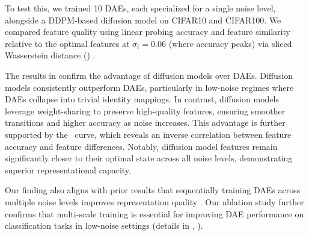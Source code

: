 To test this, we trained 10 DAEs, each specialized for a single noise level, alongside a DDPM-based diffusion model on CIFAR10 and CIFAR100. We compared feature quality using linear probing accuracy and feature similarity relative to the optimal features at $\sigma_t = 0.06$ (where accuracy peaks) via sliced Wasserstein distance (\SWD) \citep{doan2024assessing}.

The results in  confirm the advantage of diffusion models over DAEs. Diffusion models consistently outperform DAEs, particularly in low-noise regimes where DAEs collapse into trivial identity mappings. In contrast, diffusion models leverage weight-sharing to preserve high-quality features, ensuring smoother transitions and higher accuracy as noise increases. This advantage is further supported by the \SWD~curve, which reveals an inverse correlation between feature accuracy and feature differences. Notably, diffusion model features remain significantly closer to their optimal state across all noise levels, demonstrating superior representational capacity.

Our finding also aligns with prior results that sequentially training DAEs across multiple noise levels improves representation quality \citep{chandra2014adaptive,geras2014scheduled,zhang2018convolutional}. Our ablation study further confirms that multi-scale training is essential for improving DAE performance on classification tasks in low-noise settings (details in , ).
